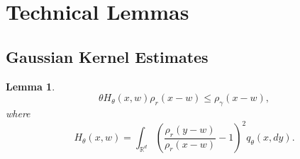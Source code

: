 \documentclass[12pt]{article}
\newtheorem{lemma}[theorem]{Lemma}
\begin{document}
\newpage


\section{Technical Lemmas}
\subsection{Gaussian Kernel Estimates}

\begin{lemma}\label{eq: Gaussin density estimates}
\begin{equation}
 \theta H_{\theta}(x,w)\rho_r(x-w)\leq \rho_{\gamma}(x-w),
\end{equation}
where
$$H_{\theta}(x,w)=\int_{\mathbb{R}^d}
    \left(
        \frac{\rho_r(y-w)}{\rho_r(x-w)}
        -
        1
    \right)^2
q_{\theta}(x,dy).$$
\end{lemma}
\end{document}
